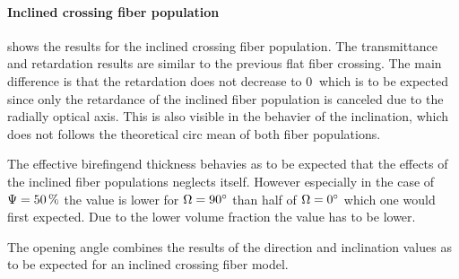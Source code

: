 \paragraph{Inclined crossing fiber population}
 shows the results for the inclined crossing fiber population.
The transmittance and retardation results are similar to the previous flat fiber crossing.
The main difference is that the retardation does not decrease to $\SI{0}{}$ which is to be expected since only the retardance of the inclined fiber population is canceled due to the radially optical axis.
This is also visible in the behavier of the inclination, which does not follows the theoretical circ mean of both fiber populations.
\par
% 
The effective birefingend thickness \trel{} behavies as to be expected that the effects of the inclined fiber populations neglects itself.
However especially in the case of $\textnormal{$\Psi$}=\SI{50}{\percent}$ the \trel{} value is lower for $\textnormal{$\Omega$}=\SI{90}{\degree}$ than half of $\textnormal{$\Omega$}=\SI{0}{\degree}$ which one would first expected.
Due to the lower volume fraction the \trel{} value has to be lower.
\par
%
The opening angle \openingAngle{} combines the results of the direction and inclination values as to be expected for an inclined crossing fiber model.
% 
%
%
